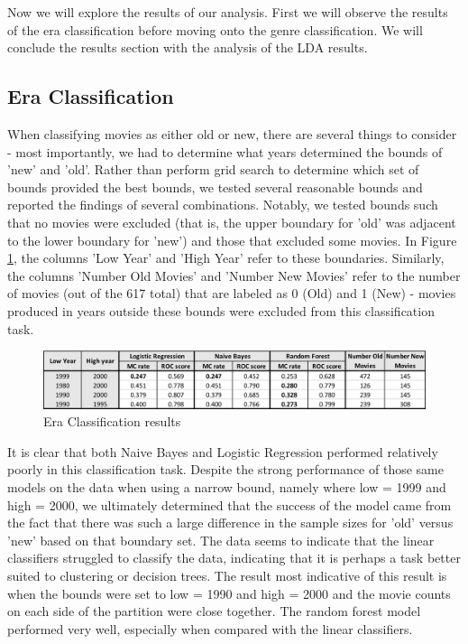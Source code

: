 \documentclass{article} %
\begin{document}
Now we will explore the results of our analysis. First we will observe the results of the era classification before moving onto the genre classification. We will conclude the results section with the analysis of the LDA results.

\subsection{Era Classification} \label{era}

When classifying movies as either old or new, there are several things to consider - most importantly, we had to determine what years determined the bounds of 'new' and 'old'. Rather than perform grid search to determine which set of bounds provided the best bounds, we tested several reasonable bounds and reported the findings of several combinations. Notably, we tested bounds such that no movies were excluded (that is, the upper boundary for 'old' was adjacent to the lower boundary for 'new') and those that excluded some movies. In Figure \ref{year_data}, the columns 'Low Year' and 'High Year' refer to these boundaries. Similarly, the columns 'Number Old Movies' and 'Number New Movies' refer to the number of movies (out of the 617 total) that are labeled as 0 (Old) and 1 (New) - movies produced in years outside these bounds were excluded from this classification task.

\begin{figure}[htb]
\centering
\includegraphics[width=1\linewidth]{year}
\caption{Era Classification results}
\label{year_data}
\end{figure}

It is clear that both Naive Bayes and Logistic Regression performed relatively poorly in this classification task. Despite the strong performance of those same models on the data when using a narrow bound, namely where low = 1999 and high = 2000, we ultimately determined that the success of the model came from the fact that there was such a large difference in the sample sizes for 'old' versus 'new' based on that boundary set. The data seems to indicate that the linear classifiers struggled to classify the data, indicating that it is perhaps a task better suited to clustering or decision trees. The result most indicative of this result is when the bounds were set to low = 1990 and high = 2000 and the movie counts on each side of the partition were close together. The random forest model performed very well, especially when compared with the linear classifiers.
\end{document}
